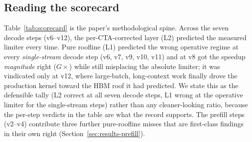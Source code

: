 \subsection{Reading the scorecard}
\label{sec:scorecard-read}
Table~\ref{tab:scorecard} is the paper's methodological spine. Across the seven
decode steps (v6--v12), the per-CTA-corrected layer (L2) predicted the measured
limiter every time. Pure roofline (L1) predicted the wrong operative regime at
every \emph{single-stream} decode step (v6, v7, v9, v10, v11) and at v8 got the
speedup \emph{magnitude} right ($G\times$) while still misplacing the absolute
limiter; it was vindicated only at v12, where large-batch, long-context work
finally drove the production kernel toward the HBM roof it had predicted. We state
this as the defensible tally (L2 correct at all seven decode steps, L1 wrong at
the operative limiter for the single-stream steps) rather than any cleaner-looking
ratio, because the per-step verdicts in the table are what the record supports.
The prefill steps (v2--v4) contribute three further pure-roofline misses that are
first-class findings in their own right (Section~\ref{sec:results-prefill}).
